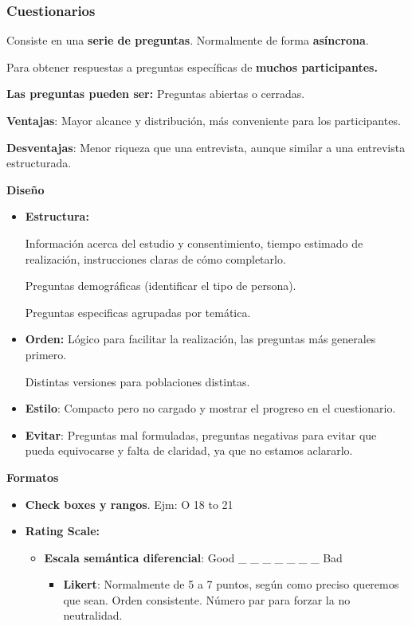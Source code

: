 \hypertarget{cuestionarios-1}{%
\subsubsection{Cuestionarios}\label{cuestionarios-1}}

Consiste en una \textbf{serie de preguntas}. Normalmente de forma
\textbf{asíncrona}.

Para obtener respuestas a preguntas específicas de \textbf{muchos
participantes.}

\textbf{Las preguntas pueden ser:} Preguntas abiertas o cerradas.

\textbf{Ventajas}: Mayor alcance y distribución, más conveniente para
los participantes.

\textbf{Desventajas}: Menor riqueza que una entrevista, aunque similar a
una entrevista estructurada.

\textbf{Diseño}

\begin{itemize}
\item
  \textbf{Estructura:}

  Información acerca del estudio y consentimiento, tiempo estimado de
  realización, instrucciones claras de cómo completarlo.

  Preguntas demográficas (identificar el tipo de persona).

  Preguntas especificas agrupadas por temática.
\item
  \textbf{Orden:} Lógico para facilitar la realización, las preguntas
  más generales primero.

  Distintas versiones para poblaciones distintas.
\item
  \textbf{Estilo}: Compacto pero no cargado y mostrar el progreso en el
  cuestionario.
\item
  \textbf{Evitar}: Preguntas mal formuladas, preguntas negativas para
  evitar que pueda equivocarse y falta de claridad, ya que no estamos
  aclararlo.
\end{itemize}

\textbf{Formatos}

\begin{itemize}
\item
  \textbf{Check boxes y rangos}. Ejm: O 18 to 21
\item
  \textbf{Rating Scale:}

  \begin{itemize}
  \tightlist
  \item
    \textbf{Escala semántica diferencial}: Good \_ \_ \_ \_ \_ \_ \_ Bad

    \begin{itemize}
    \tightlist
    \item
      \textbf{Likert}: Normalmente de 5 a 7 puntos, según como preciso
      queremos que sean. Orden consistente. Número par para forzar la no
      neutralidad.
    \end{itemize}
  \end{itemize}
\end{itemize}

